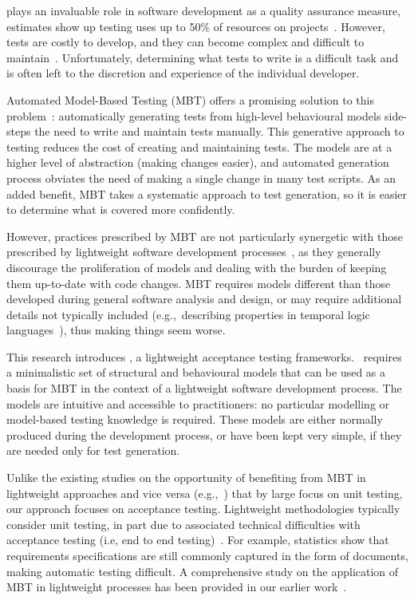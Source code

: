 %
%
\label{sec:introduction}
 plays an invaluable role in software development as a quality assurance measure, estimates show up testing uses up to 50\% of resources on projects~\cite{Beizer1990}. However, tests are costly to develop, and they can become complex and difficult to maintain~\cite{Farago2010a}. Unfortunately, determining what tests to write is a difficult task and is often left to the discretion and experience of the individual developer.

Automated Model-Based Testing (MBT) offers a promising solution to this problem~\cite{Tretmans2008}: automatically generating tests from high-level behavioural models side-steps the need to write and maintain tests manually. 
This generative approach to testing reduces the cost of creating and maintaining tests. The models are at a higher level of abstraction (making changes easier), and automated generation process obviates the need of making a single change in many test scripts. 
As an added benefit, MBT takes a systematic approach to test generation, so it is easier to determine what is covered more confidently.

However, practices prescribed by MBT are not particularly synergetic with those prescribed by lightweight software development processes~\cite{Farago2010a}, as they generally discourage the proliferation of models and dealing with the burden of keeping them up-to-date with code changes. 
MBT requires models different than those developed during general software analysis and design, or may require additional details not typically included (e.g.,\ describing properties in temporal logic languages~\cite{Tan2004}), thus making things seem worse. %

This research introduces \this, a lightweight acceptance testing frameworks. \this~requires a minimalistic set of structural and behavioural models that can be used as a basis for MBT in the context of a lightweight software development process. The models are intuitive and accessible to practitioners: no particular modelling or model-based testing knowledge is required. These models are either normally produced during the development process, or have been kept very simple, if they are needed only for test generation.


Unlike the existing studies on the opportunity of benefiting from MBT in lightweight approaches and vice versa (e.g.,~\cite{Katara2006,Farago2010b,Loffler2010,Ussami2016}) that by large focus on unit testing, our approach focuses on acceptance testing. Lightweight methodologies typically consider unit testing, in part due to associated technical difficulties with acceptance testing (i.e, end to end testing)~\cite{Ambler2008,Ambler}. For example, statistics show that requirements specifications are still commonly captured in the form of documents, making automatic testing difficult.
A comprehensive study on the application of MBT in lightweight processes has been provided in our earlier work~\cite{Jalalinasab2012}. 

